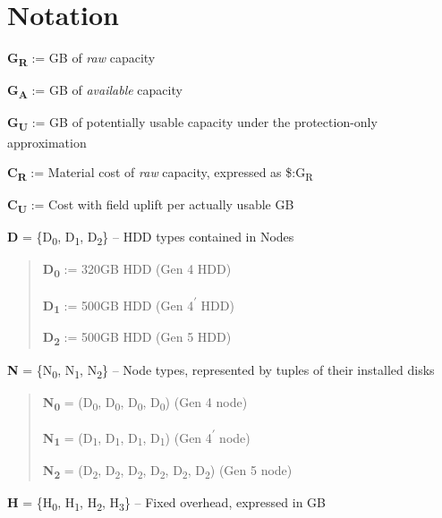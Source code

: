 \section{Notation}\label{notation-1}
\begingroup
\setlength{\parskip}{3pt}

\textbf{G}\textsubscript{\textbf{R}}\textbf{ } := GB of \emph{raw} capacity

\textbf{G}\textsubscript{\textbf{A}}\textbf{ } := GB of \emph{available} capacity

\textbf{G}\textsubscript{\textbf{U}} := GB of potentially usable capacity under the protection-only approximation

\textbf{C}\textsubscript{\textbf{R}} := Material cost of \emph{raw} capacity, expressed as \$:G\textsubscript{R}

\textbf{C}\textsubscript{\textbf{U}} := Cost with field uplift per actually usable GB

\textbf{D} = \{D\textsubscript{0}, D\textsubscript{1}, D\textsubscript{2}\} -- HDD types contained in Nodes

\begin{quote}
\textbf{D}\textsubscript{\textbf{0}} := 320GB HDD (Gen 4 HDD)

\textbf{D}\textsubscript{\textbf{1}} := 500GB HDD (Gen 4\textsuperscript{\ensuremath{\prime}} HDD)

\textbf{D}\textsubscript{\textbf{2}} := 500GB HDD (Gen 5 HDD)
\end{quote}

\textbf{N} = \{N\textsubscript{0}, N\textsubscript{1}, N\textsubscript{2}\} -- Node types, represented by tuples of their installed disks

\begin{quote}
\textbf{N}\textsubscript{\textbf{0}} = (D\textsubscript{0}, D\textsubscript{0}, D\textsubscript{0}, D\textsubscript{0}) (Gen 4 node)

\textbf{N}\textsubscript{\textbf{1}} = (D\textsubscript{1}, D\textsubscript{1}, D\textsubscript{1}, D\textsubscript{1}) (Gen 4\textsuperscript{\ensuremath{\prime}} node)

\textbf{N}\textsubscript{\textbf{2}} = (D\textsubscript{2}, D\textsubscript{2}, D\textsubscript{2}, D\textsubscript{2}, D\textsubscript{2}, D\textsubscript{2}) (Gen 5 node)
\end{quote}

\textbf{H} = \{H\textsubscript{0}, H\textsubscript{1}, H\textsubscript{2}, H\textsubscript{3}\} -- Fixed overhead, expressed in GB

